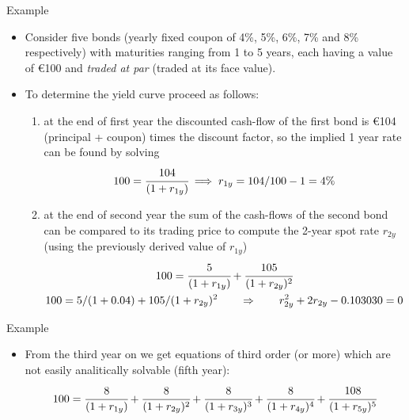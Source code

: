 \documentclass{beamer}
\begin{document}
\begin{frame}[fragile]{Example}
\begin{itemize}
\item Consider five bonds (yearly fixed coupon of 4\%, 5\%, 6\%, 7\% and 8\% respectively) with maturities ranging from 1 to 5 years, each having a value of €100 and \emph{traded at par} (traded at its face value). 
\item To determine the yield curve proceed as follows:
\begin{enumerate}
   \item at the end of first year the discounted cash-flow of the first bond is €104 (principal + coupon) times the discount factor, so the implied 1 year rate can be found by solving
   \begin{equation*}
 100 = \cfrac{104}{(1 + r_{1y})}\implies r_{1y} =  104/100 - 1 = 4\%
 \end{equation*}
 \item at the end of second year the sum of the cash-flows of the second bond can be compared to its trading price to compute the 2-year spot rate $r_{2y}$ (using the previously derived value of $r_{1y}$)
    \begin{equation*}
    \begin{gathered}
 100 = \cfrac{5}{(1 + r_{1y})} + \cfrac{105}{(1 + r_{2y})^{2}} \\
 100 = 5 / (1 + 0.04) + 105 / (1 + r_{2y})^{2}\qquad\Rightarrow\qquad r_{2y}^2  + 2 r_{2y}  - 0.103030 = 0
 \end{gathered}
 \end{equation*}
 \end{enumerate}
 \end{itemize}
\end{frame}
 
\begin{frame}[fragile]{Example}
\begin{itemize}
 This second order equation can be solved either by hand or with \texttt{numpy.roots}.
 \begin{equation*}
    r_{2y} = - 1 \pm \sqrt{1 + 0.103030} = \begin{cases}-2.05023 \\ 0.0502\end{cases}
    \end{equation*}
    
 \begin{ipython}
import numpy as np
np.roots([1, 2, -0.103030])
\end{ipython}
\begin{ioutput}
array([-2.05025235,  0.05025235])
\end{ioutput}
\item From the third year on we get equations of third order (or more) which are not easily analitically solvable (fifth year):
 \begin{equation*}
 100 = \cfrac{8} {(1 + r_{1y})} + \cfrac{8} {(1 + r_{2y})^{2}}+ \cfrac{8} {(1 + r_{3y})^{3}} + \cfrac{8} {(1 + r_{4y})^{4}} + \cfrac{108} {(1 + r_{5y})^{5}}
 \end{equation*}
\end{itemize}
\end{frame}  
 
\end{document}
